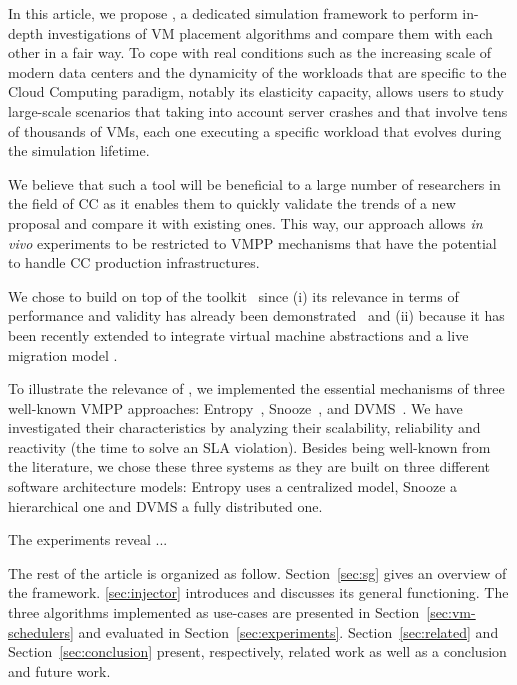  In this article, we propose %
\vmps, a dedicated simulation framework to perform in-depth
investigations of VM placement algorithms and compare them with each
other in a fair way. To cope with real conditions such as the
increasing scale of modern data centers and the dynamicity of the
workloads that are specific to the Cloud Computing paradigm, notably
its elasticity capacity, \vmps allows users to study large-scale
scenarios that taking into account server crashes and that involve
tens of thousands of VMs, each one executing a specific workload that
evolves during the simulation lifetime.

We believe that such a tool will be beneficial to a large number of
researchers in the field of CC as it enables them to quickly validate
the trends of a new proposal and compare it with existing
ones. This way, our approach allows \textit{in vivo} experiments to be
restricted to VMPP mechanisms that have the potential to handle CC
production infrastructures.

%
We chose to build \vmps on top of the \sg
toolkit~\cite{casanova:hal-01017319} since (i) its relevance in terms
of performance and validity has already been
demonstrated~\cite{simgridpub} and (ii) because it has been recently
extended to integrate virtual machine abstractions and a live
migration model \cite{Hirofuchi:2013:ALM:2568486.2568524}.

To illustrate the relevance of \vmps, we implemented the essential
mechanisms of three well-known VMPP approaches:
Entropy~\cite{Hermenier:2009:ECM:1508293.1508300},
Snooze~\cite{feller:ccgrid12}, and DVMS~\cite{quesnel:cpe2012}. We
have investigated their characteristics by analyzing their
scalability, reliability and reactivity (\ie the time to solve an SLA
violation). Besides being well-known from the literature, we chose
these three systems as they are built on three different software
architecture models: Entropy uses a centralized model, Snooze a
hierarchical one and DVMS a fully distributed one.

The experiments reveal ...

The rest of the article is organized as follow. Section~\ref{sec:sg}
gives an overview of the \sg framework.  \ref{sec:injector} introduces
\vmps and discusses its general functioning.  The three algorithms
implemented as use-cases are presented in
Section~\ref{sec:vm-schedulers} and evaluated in
Section~\ref{sec:experiments}.  Section~\ref{sec:related} and
Section~\ref{sec:conclusion} present, respectively, related work as
well as a conclusion and future work.

